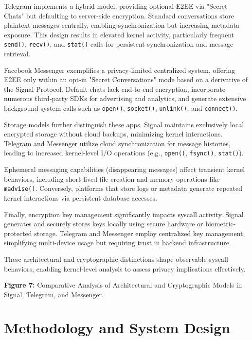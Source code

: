 \documentclass[a4paper,12pt]{report}
\begin{document}
Telegram implements a hybrid model, providing optional E2EE via "Secret Chats" but defaulting to server-side encryption. Standard conversations store plaintext messages centrally, enabling synchronization but increasing metadata exposure. This design results in elevated kernel activity, particularly frequent \texttt{send()}, \texttt{recv()}, and \texttt{stat()} calls for persistent synchronization and message retrieval.

Facebook Messenger exemplifies a privacy-limited centralized system, offering E2EE only within an opt-in "Secret Conversations" mode based on a derivative of the Signal Protocol. Default chats lack end-to-end encryption, incorporate numerous third-party SDKs for advertising and analytics, and generate extensive background system calls such as \texttt{open()}, \texttt{socket()}, \texttt{unlink()}, and \texttt{connect()}.

Storage models further distinguish these apps. Signal maintains exclusively local encrypted storage without cloud backups, minimizing kernel interactions. Telegram and Messenger utilize cloud synchronization for message histories, leading to increased kernel-level I/O operations (e.g., \texttt{open()}, \texttt{fsync()}, \texttt{stat()}).

Ephemeral messaging capabilities (disappearing messages) affect transient kernel behaviors, including short-lived file creation and memory operations like \texttt{madvise()}. Conversely, platforms that store logs or metadata generate repeated kernel interactions via persistent database accesses.

Finally, encryption key management significantly impacts syscall activity. Signal generates and securely stores keys locally using secure hardware or biometric-protected storage. Telegram and Messenger employ centralized key management, simplifying multi-device usage but requiring trust in backend infrastructure.

These architectural and cryptographic distinctions shape observable syscall behaviors, enabling kernel-level analysis to assess privacy implications effectively.

\textbf{Figure 7:} Comparative Analysis of Architectural and Cryptographic Models in Signal, Telegram, and Messenger.

\chapter{Methodology and System Design}
\end{document}
